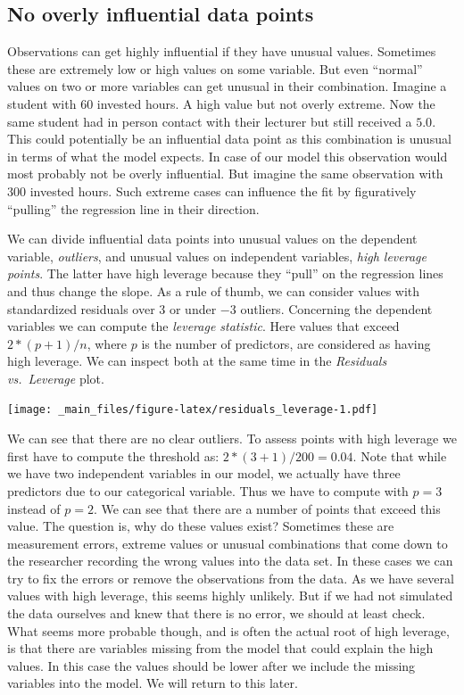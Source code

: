 \documentclass[
]{book}
\begin{document}
\hypertarget{no-overly-influential-data-points}{%
\subsection{No overly influential data points}\label{no-overly-influential-data-points}}

Observations can get highly influential if they have unusual values. Sometimes these are extremely low or high values on some variable. But even ``normal'' values on two or more variables can get unusual in their combination. Imagine a student with \(60\) invested hours. A high value but not overly extreme. Now the same student had in person contact with their lecturer but still received a \(5.0\). This could potentially be an influential data point as this combination is unusual in terms of what the model expects. In case of our model this observation would most probably not be overly influential. But imagine the same observation with \(300\) invested hours. Such extreme cases can influence the fit by figuratively ``pulling'' the regression line in their direction.

We can divide influential data points into unusual values on the dependent variable, \emph{outliers}, and unusual values on independent variables, \emph{high leverage points}. The latter have high leverage because they ``pull'' on the regression lines and thus change the slope. As a rule of thumb, we can consider values with standardized residuals over \(3\) or under \(-3\) outliers. Concerning the dependent variables we can compute the \emph{leverage statistic}. Here values that exceed \(2 * (p + 1) / n\), where \(p\) is the number of predictors, are considered as having high leverage. We can inspect both at the same time in the \emph{Residuals vs.~Leverage} plot.

\texttt{[image: \_main\_files/figure-latex/residuals\_leverage-1.pdf]}

We can see that there are no clear outliers. To assess points with high leverage we first have to compute the threshold as: \(2 * (3 + 1) / 200 = 0.04\). Note that while we have two independent variables in our model, we actually have three predictors due to our categorical variable. Thus we have to compute with \(p = 3\) instead of \(p = 2\). We can see that there are a number of points that exceed this value. The question is, why do these values exist? Sometimes these are measurement errors, extreme values or unusual combinations that come down to the researcher recording the wrong values into the data set. In these cases we can try to fix the errors or remove the observations from the data. As we have several values with high leverage, this seems highly unlikely. But if we had not simulated the data ourselves and knew that there is no error, we should at least check. What seems more probable though, and is often the actual root of high leverage, is that there are variables missing from the model that could explain the high values. In this case the values should be lower after we include the missing variables into the model. We will return to this later.
\end{document}
